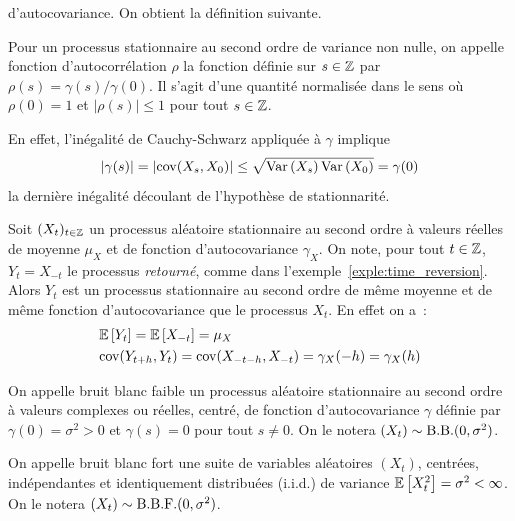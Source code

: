 d'autocovariance. On obtient la d\'efinition suivante.
\begin{definition}
  Pour un processus stationnaire au second ordre de variance non nulle, on
  appelle fonction d'autocorr\'elation $\rho$ la fonction d\'efinie sur $s\in\mathbb{Z}$
  par $\rho(s)= \gamma(s)/\gamma(0)$. Il s'agit d'une quantit\'e normalis\'ee dans
  le sens o\`u $\rho(0) = 1$ et $|\rho(s)| \leq 1$ pour tout $s\in\mathbb{Z}$.
\end{definition}
En effet, l'in\'egalit\'e de Cauchy-Schwarz  appliqu\'ee \`a $\gamma$ implique
\[
 |\gamma(s)|
  = \left|\mathrm{cov}(X_{s},X_0)\right| \leq
    \sqrt{\mathrm{Var}\left( X_{s} \right)\mathrm{Var}\left( X_0 \right)} = \gamma(0)
\]
la derni\`ere in\'egalit\'e d\'ecoulant de l'hypoth\`ese de
stationnarit\'e.%
\begin{example}
  \label{exe:stat_retourne} Soit $(X_t)_{t\in\mathbb{Z}}$ un processus al\'eatoire
  stationnaire au second ordre \`a valeurs r\'eelles de moyenne $\mu_X$ et de
  fonction d'autocovariance $\gamma_X$. On note, pour tout $t\in\mathbb{Z}$,
  $Y_t=X_{-t}$ le processus {\it retourn\'e}, comme dans
  l'exemple~\ref{exple:time_reversion}. Alors $Y_t$ est un processus
  stationnaire au second ordre de m\^{e}me moyenne et de m\^{e}me fonction
  d'autocovariance que le processus $X_t$. En effet on a~:
 \begin{align*}
  &{\mathbb E}\left[ Y_t \right]= {\mathbb E}\left[ X_{-t} \right]=\mu_X\\
  &\mathrm{cov}(Y_{t+h},Y_t)=\mathrm{cov}(X_{-t-h},X_{-t})=\gamma_X(-h)=\gamma_X(h)
 \end{align*}
\end{example}
\begin{definition}
  On appelle bruit blanc faible un processus al\'eatoire stationnaire au second
  ordre \`a valeurs complexes ou r\'eelles, centr\'e, de fonction d'autocovariance
  $\gamma$ d\'efinie par $\gamma(0)= \sigma^2>0$ et $\gamma(s)=0$  pour tout
  $s\neq0$. On le notera $ (X_{t}) \sim  \mathrm{B.B.}(0,\sigma^2)$.
\end{definition}
\begin{definition}
On appelle bruit blanc fort une suite de variables
al\'eatoires $(X_{t})$, centr\'ees, ind\'ependantes et identiquement
distribu\'ees (i.i.d.) de variance ${\mathbb E}\left[ X_{t}^2 \right] = \sigma^2 <
\infty$. On le notera $ (X_{t}) \sim \mathrm{B.B.F.}(0,\sigma^2)$.
\end{definition}
